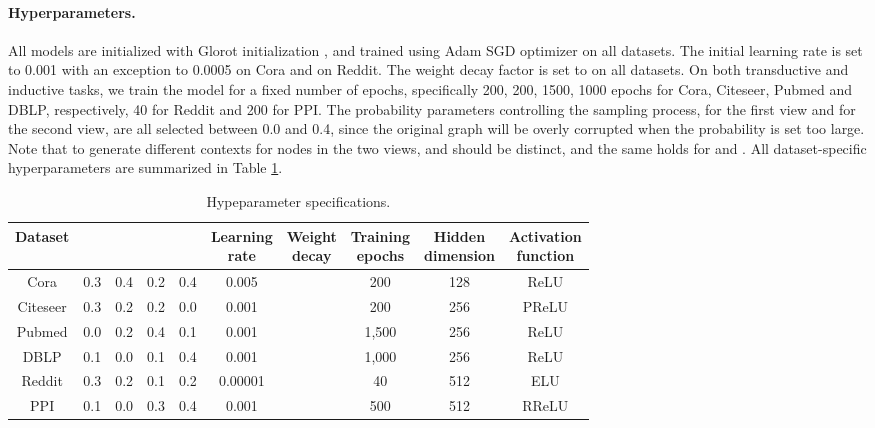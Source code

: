 \documentclass{article}
\theoremstyle{remark}
\begin{document}
\paragraph{Hyperparameters.}
All models are initialized with Glorot initialization \cite{Glorot:2010uc}, and trained using Adam SGD optimizer \cite{Kingma:2015us} on all datasets.
The initial learning rate is set to 0.001 with an exception to 0.0005 on Cora and  on Reddit.
The  weight decay factor is set to  on all datasets.
On both transductive and inductive tasks, we train the model for a fixed number of epochs, specifically 200, 200, 1500, 1000 epochs for Cora, Citeseer, Pubmed and DBLP, respectively, 40 for Reddit and 200 for PPI.
The probability parameters controlling the sampling process,  for the first view and  for the second view, are all selected between 0.0 and 0.4, since the original graph will be overly corrupted when the probability is set too large. Note that to generate different contexts for nodes in the two views,  and  should be distinct, and the same holds for  and .
All dataset-specific hyperparameters are summarized in Table \ref{tab:hyperparameters}.

\begin{table}[h]
	\small
	\centering
	\caption{Hypeparameter specifications.}
    \begin{tabular}{cccccccccc}
	\toprule
	Dataset &  &  &  &  & \makecell{Learning\\rate} & \makecell{Weight\\decay} & \makecell{Training\\epochs} & \makecell{Hidden\\dimension} & \makecell{Activation\\function} \\
	\midrule
	Cora  & 0.3   & 0.4   & 0.2   & 0.4   & 0.005 &  & 200   & 128   & ReLU \\
	Citeseer & 0.3   & 0.2   & 0.2   & 0.0   & 0.001 &  & 200   & 256   & PReLU \\
	Pubmed & 0.0   & 0.2   & 0.4   & 0.1   & 0.001 &  & 1,500  & 256   & ReLU \\
	DBLP  & 0.1   & 0.0   & 0.1   & 0.4   & 0.001 &  & 1,000  & 256   & ReLU \\
	\midrule
	Reddit & 0.3   & 0.2   & 0.1   & 0.2   & 0.00001 &  & 40    & 512   & ELU \\
	PPI   & 0.1   & 0.0   & 0.3   & 0.4   & 0.001 &  & 500   & 512   & RReLU \\
	\bottomrule
	\end{tabular}
	\label{tab:hyperparameters}
\end{table}
\end{document}
